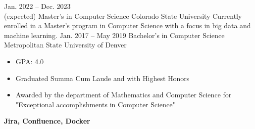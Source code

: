 \documentclass[8pt]{resumeclass}
\begin{document}

\begin{entrylist}
	\entry
		{Jan. 2022 -- Dec. 2023\\ (expected)}
		{Master's in Computer Science}
		{Colorado State University}
		{Currently enrolled in a Master's program in Computer Science with a focus in big data and machine learning.}
	\entry
		{Jan. 2017 -- May 2019}
		{Bachelor's in Computer Science}
		{Metropolitan State University of Denver}
		{{\vspace{-4mm}\begin{itemize}[noitemsep,nolistsep]
			\small
			\item GPA: 4.0
			\item Graduated Summa Cum Laude and with Highest Honors
			\item Awarded by the department of Mathematics and Computer Science for "Exceptional accomplishments in Computer Science"
		\end{itemize}}}
\end{entrylist}


\vspace{6pt}
\begin{minipage}[t]{0.5\textwidth}
	\vspace{-\baselineskip}

\end{minipage}
\hfill
\begin{minipage}[t]{0.5\textwidth}
	\vspace{-\baselineskip}

	\textbf{Jira, Confluence, Docker}\\
\end{minipage}
\end{document}
